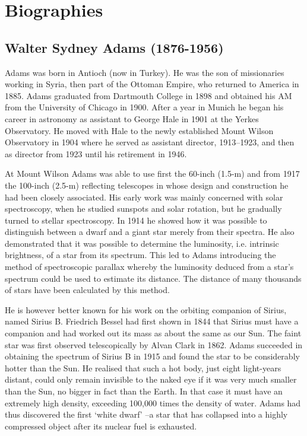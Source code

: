\section{Biographies}\label{sec:bio}

\subsection[Walter \scshape{Adams}]{Walter Sydney Adams (1876-1956)}\label{bio:adams}
Adams was born in Antioch (now in Turkey). He was the son of missionaries working in Syria, then part of the Ottoman Empire, who returned to America in 1885. Adams graduated from Dartmouth College in 1898 and obtained his AM from the University of Chicago in 1900. After a year in Munich he began his career in astronomy as assistant to George Hale in 1901 at the Yerkes Observatory. He moved with Hale to the newly established Mount Wilson Observatory in 1904 where he served as assistant director, 1913--1923, and then as director from 1923 until his retirement in 1946.

At Mount Wilson Adams was able to use first the 60-inch (1.5-m) and from 1917 the 100-inch (2.5-m) reflecting telescopes in whose design and construction he had been closely associated. His early work was mainly concerned with solar spectroscopy, when he studied sunspots and solar rotation, but he gradually turned to stellar spectroscopy. In 1914 he showed how it was possible to distinguish between a dwarf and a giant star merely from their spectra. He also demonstrated that it was possible to determine the luminosity, i.e. intrinsic brightness, of a star from its spectrum. This led to Adams introducing the method of spectroscopic parallax whereby the luminosity deduced from a star's spectrum could be used to estimate its distance. The distance of many thousands of stars have been calculated by this method.

He is however better known for his work on the orbiting companion of Sirius, named Sirius B. Friedrich Bessel had first shown in 1844 that Sirius must have a companion and had worked out its mass as about the same as our Sun. The faint star was first observed telescopically by Alvan Clark in 1862. Adams succeeded in obtaining the spectrum of Sirius B in 1915 and found the star to be considerably hotter than the Sun. He realised that such a hot body, just eight light-years distant, could only remain invisible to the naked eye if it was very much smaller than the Sun, no bigger in fact than the Earth. In that case it must have an extremely high density, exceeding 100,000 times the density of water. Adams had thus discovered the first ‘white dwarf’ --a star that has collapsed into a highly compressed object after its nuclear fuel is exhausted.

